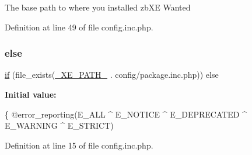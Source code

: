 The base path to where you installed zb\+XE Wanted 

Definition at line 49 of file config.\+inc.\+php.

\mbox{\label{config_8inc_8php_a2ce235f4b0eae6ddda3fbba6b934468a}} 
\subsubsection{\texorpdfstring{else}{else}}
{\footnotesize\ttfamily \hyperlink{config_8inc_8php_a73b98c0274e28635a594091f9ca43cb4}{if} (file\+\_\+exists(\hyperlink{config_8inc_8php_a5387c7a3f2aa38adf16f324cee88db88}{\+\_\+\+X\+E\+\_\+\+P\+A\+T\+H\+\_\+} . \textquotesingle{}config/package.\+inc.\+php\textquotesingle{})) else}

{\bfseries Initial value\+:}
\begin{DoxyCode}
\{
    @error\_reporting(E\_ALL ^ E\_NOTICE ^ E\_DEPRECATED ^ E\_WARNING ^ E\_STRICT)
\end{DoxyCode}


Definition at line 15 of file config.\+inc.\+php.

\mbox{\label{config_8inc_8php_a73b98c0274e28635a594091f9ca43cb4}} 
